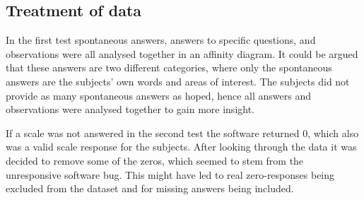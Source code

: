 \subsection{Treatment of data}
In the first test spontaneous answers, answers to specific questions, and observations were all analysed together in an affinity diagram. It could be argued that these answers are two different categories, where only the spontaneous answers are the subjects' own words and areas of interest. The subjects did not provide as many spontaneous answers as hoped, hence all answers and observations were analysed together to gain more insight. 

If a scale was not answered in the second test the software returned 0, which also was a valid scale response for the subjects. After looking through the data it was decided to remove some of the zeros, which seemed to stem from the unresponsive software bug. This might have led to real zero-responses being excluded from the dataset and for missing answers being included.